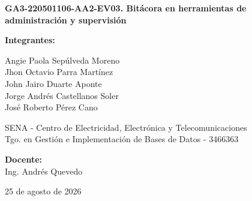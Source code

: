 	\begin{titlepage}
		\centering
		
		{\Large\bfseries GA3-220501106-AA2-EV03. Bitácora en herramientas de administración y supervisión \par}
		
		\vspace{5.5cm}
		
		{\large \textbf{Integrantes:} \par}
		\vspace{0.3cm}
		Angie Paola Sepúlveda Moreno \\
		Jhon Octavio Parra Martínez \\
		John Jairo Duarte Aponte \\
		Jorge Andrés Castellanos Soler \\
		José Roberto Pérez Cano \\
		
		\vfill
		
		SENA - Centro de Electricidad, Electrónica y Telecomunicaciones \\
		Tgo. en Gestión e Implementación de Bases de Datos - 3466363 \\
		
		\vspace{1cm}
		
		\textbf{Docente:} \\
		Ing. Andrés Quevedo \\
		
		\vspace{1.5cm}
		
		25 de agosto de 2026 \par
		
	\end{titlepage}
